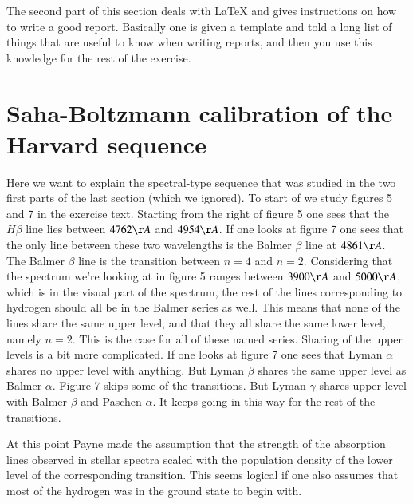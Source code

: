 \documentclass{aa}   %
\begin{document}
The second part of this section deals with LaTeX and gives instructions on how to write a good report.
Basically one is given a template and told a long list of things that are useful to know when writing reports, and then you use this knowledge for the rest of the exercise.



\section{Saha-Boltzmann calibration of the Harvard sequence}   \label{sec:Saha}
Here we want to explain the spectral-type sequence that was studied in the two first parts of the last section (which we ignored).
To start of we study figures 5 and 7 in the exercise text. Starting from the right of figure 5 one sees that the $H\beta$ line lies between $4762 \AA$ and $4954 \AA$. If one looks at figure 7 one sees that the only line between these two wavelengths is the Balmer $\beta$ line at $4861 \AA$. The Balmer $\beta$ line is the transition between $n = 4$ and $n = 2$. 
Considering that the spectrum we're looking at in figure 5 ranges between $3900 \AA$ and $5000 \AA$, which is in the visual part of the spectrum, the rest of the lines corresponding to hydrogen should all be in the Balmer series as well. This means that none of the lines share the same upper level, and that they all share the same lower level, namely $n = 2$.
This is the case for all of these named series. Sharing of the upper levels is a bit more complicated. If one looks at figure 7 one sees that Lyman $\alpha$ shares no upper level with anything. But Lyman $\beta$ shares the same upper level as Balmer $\alpha$. Figure 7 skips some of the transitions. But Lyman $\gamma$ shares upper level with Balmer $\beta$ and Paschen $\alpha$. It keeps going in this way for the rest of the transitions.

At this point Payne made the assumption that the strength of the absorption lines observed in stellar spectra scaled with the population density of the lower level of the corresponding transition. 
This seems logical if one also assumes that most of the hydrogen was in the ground state to begin with.
\end{document}

